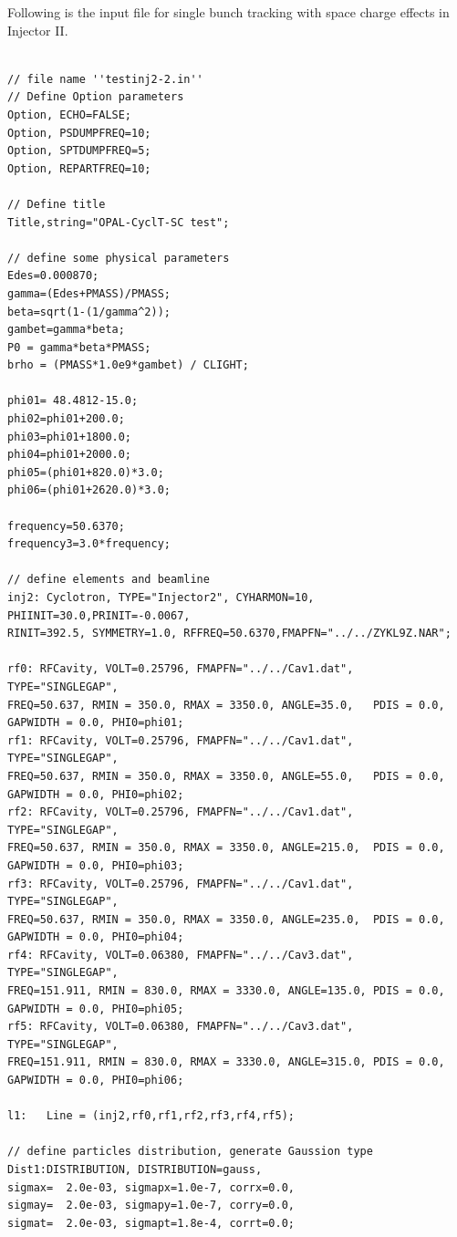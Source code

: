 Following is the input file for single bunch tracking with space charge effects in Injector II.
{ \footnotesize
\begin{verbatim}
 
// file name ''testinj2-2.in''
// Define Option parameters 
Option, ECHO=FALSE;
Option, PSDUMPFREQ=10;
Option, SPTDUMPFREQ=5;
Option, REPARTFREQ=10;

// Define title
Title,string="OPAL-CyclT-SC test";

// define some physical parameters 
Edes=0.000870;
gamma=(Edes+PMASS)/PMASS;
beta=sqrt(1-(1/gamma^2));
gambet=gamma*beta;
P0 = gamma*beta*PMASS;
brho = (PMASS*1.0e9*gambet) / CLIGHT;

phi01= 48.4812-15.0;
phi02=phi01+200.0;
phi03=phi01+1800.0;
phi04=phi01+2000.0;
phi05=(phi01+820.0)*3.0;
phi06=(phi01+2620.0)*3.0;

frequency=50.6370;
frequency3=3.0*frequency;

// define elements and beamline
inj2: Cyclotron, TYPE="Injector2", CYHARMON=10, PHIINIT=30.0,PRINIT=-0.0067,
RINIT=392.5, SYMMETRY=1.0, RFFREQ=50.6370,FMAPFN="../../ZYKL9Z.NAR";

rf0: RFCavity, VOLT=0.25796, FMAPFN="../../Cav1.dat", TYPE="SINGLEGAP",
FREQ=50.637, RMIN = 350.0, RMAX = 3350.0, ANGLE=35.0,   PDIS = 0.0,
GAPWIDTH = 0.0, PHI0=phi01;
rf1: RFCavity, VOLT=0.25796, FMAPFN="../../Cav1.dat", TYPE="SINGLEGAP",
FREQ=50.637, RMIN = 350.0, RMAX = 3350.0, ANGLE=55.0,   PDIS = 0.0,
GAPWIDTH = 0.0, PHI0=phi02;
rf2: RFCavity, VOLT=0.25796, FMAPFN="../../Cav1.dat", TYPE="SINGLEGAP",
FREQ=50.637, RMIN = 350.0, RMAX = 3350.0, ANGLE=215.0,  PDIS = 0.0,
GAPWIDTH = 0.0, PHI0=phi03;
rf3: RFCavity, VOLT=0.25796, FMAPFN="../../Cav1.dat", TYPE="SINGLEGAP",
FREQ=50.637, RMIN = 350.0, RMAX = 3350.0, ANGLE=235.0,  PDIS = 0.0,
GAPWIDTH = 0.0, PHI0=phi04;
rf4: RFCavity, VOLT=0.06380, FMAPFN="../../Cav3.dat", TYPE="SINGLEGAP",
FREQ=151.911, RMIN = 830.0, RMAX = 3330.0, ANGLE=135.0, PDIS = 0.0,
GAPWIDTH = 0.0, PHI0=phi05;
rf5: RFCavity, VOLT=0.06380, FMAPFN="../../Cav3.dat", TYPE="SINGLEGAP",
FREQ=151.911, RMIN = 830.0, RMAX = 3330.0, ANGLE=315.0, PDIS = 0.0,
GAPWIDTH = 0.0, PHI0=phi06;

l1:   Line = (inj2,rf0,rf1,rf2,rf3,rf4,rf5);

// define particles distribution, generate Gaussion type
Dist1:DISTRIBUTION, DISTRIBUTION=gauss,
sigmax=  2.0e-03, sigmapx=1.0e-7, corrx=0.0,
sigmay=  2.0e-03, sigmapy=1.0e-7, corry=0.0,
sigmat=  2.0e-03, sigmapt=1.8e-4, corrt=0.0;


\end{verbatim}}
